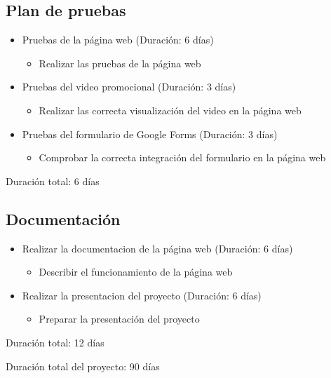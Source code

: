 \documentclass{report}
\begin{document}
            \subsection{Plan de pruebas}
                \begin{itemize}
                    \item Pruebas de la página web (Duración: 6 días)
                    \begin{itemize}
                        \item Realizar las pruebas de la página web
                    \end{itemize}
                    \item Pruebas del video promocional (Duración: 3 días)
                    \begin{itemize}
                        \item Realizar las correcta visualización del video en la página web
                    \end{itemize}
                    \item Pruebas del formulario de Google Forms (Duración: 3 días)
                    \begin{itemize}
                        \item Comprobar la correcta integración del formulario en la página web
                    \end{itemize}
                \end{itemize}
                Duración total: 6 días
            \subsection{Documentación}
                \begin{itemize}
                    \item Realizar la documentacion de la página web (Duración: 6 días)
                    \begin{itemize}
                        \item Describir el funcionamiento de la página web
                    \end{itemize}
                    \item Realizar la presentacion del proyecto (Duración: 6 días)
                    \begin{itemize}
                        \item Preparar la presentación del proyecto
                    \end{itemize}
                \end{itemize}
                Duración total: 12 días
            \vfill
        \begin{center}
            Duración total del proyecto: 90 días
        \end{center}
\end{document}
